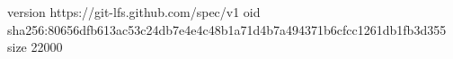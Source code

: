 version https://git-lfs.github.com/spec/v1
oid sha256:80656dfb613ac53c24db7e4e4c48b1a71d4b7a494371b6cfcc1261db1fb3d355
size 22000
